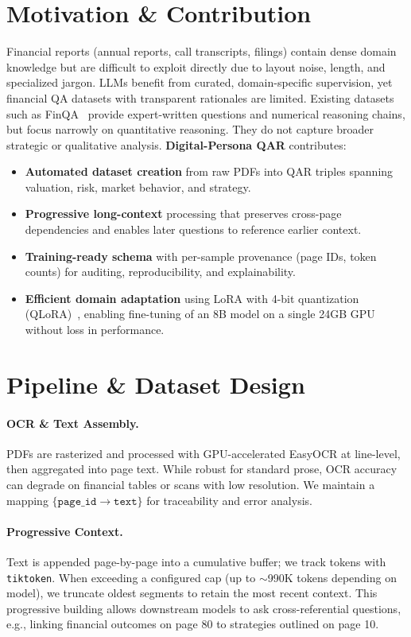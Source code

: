 \documentclass[sigconf,authordraft,anonymous]{acmart}
\begin{document}
\section{Motivation \& Contribution}
Financial reports (annual reports, call transcripts, filings) contain dense domain knowledge but are difficult to exploit directly due to layout noise, length, and specialized jargon. LLMs benefit from curated, domain-specific supervision, yet financial QA datasets with transparent rationales are limited. Existing datasets such as FinQA~\cite{chen2022finqadatasetnumericalreasoning} provide expert-written questions and numerical reasoning chains, but focus narrowly on quantitative reasoning. They do not capture broader strategic or qualitative analysis. \textbf{Digital-Persona QAR} contributes:
\begin{itemize}
  \item \textbf{Automated dataset creation} from raw PDFs into QAR triples spanning valuation, risk, market behavior, and strategy.
  \item \textbf{Progressive long-context} processing that preserves cross-page dependencies and enables later questions to reference earlier context.
  \item \textbf{Training-ready schema} with per-sample provenance (page IDs, token counts) for auditing, reproducibility, and explainability.
  \item \textbf{Efficient domain adaptation} using LoRA with 4-bit quantization (QLoRA)~\cite{dettmers2023qloraefficientfinetuningquantized}, enabling fine-tuning of an 8B model on a single 24GB GPU without loss in performance.
\end{itemize}

\section{Pipeline \& Dataset Design}
\paragraph{OCR \& Text Assembly.}
PDFs are rasterized and processed with GPU-accelerated EasyOCR at line-level, then aggregated into page text. While robust for standard prose, OCR accuracy can degrade on financial tables or scans with low resolution. We maintain a mapping $\{\texttt{page\_id} \rightarrow \texttt{text}\}$ for traceability and error analysis.

\paragraph{Progressive Context.}
Text is appended page-by-page into a cumulative buffer; we track tokens with \texttt{tiktoken}. When exceeding a configured cap (up to $\sim$990K tokens depending on model), we truncate oldest segments to retain the most recent context. This progressive building allows downstream models to ask cross-referential questions, e.g., linking financial outcomes on page 80 to strategies outlined on page 10.
\end{document}
